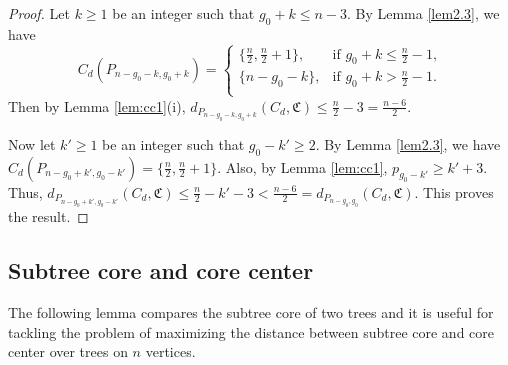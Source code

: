 \documentclass[11pt]{article}
\begin{document}
\begin{proof}
Let $k\geq 1$ be an integer such that $g_0+k\leq n-3$. By Lemma \ref{lem2.3}, we have 
$$C_d(P_{n-g_0-k,g_0+k})=\left\{
\begin{array}{ll}
 \{\frac{n}{2},\frac{n}{2}+1 \},  &\text{if $g_0+k\leq \frac{n}{2}-1$,}\\
  \{n-g_0-k\}, &\text{if $g_0+k> \frac{n}{2}-1$.}\\
\end{array}
\right.$$ 
Then by Lemma \ref{lem:cc1}(i), $d_{P_{n - g_0-k, g_0+k}}(C_d,\mathfrak{C})\leq \frac{n}{2} - 3=\frac{n-6}{2}.$

Now let $k'\geq 1$ be an integer such that $g_0-k'\geq 2$. By Lemma \ref{lem2.3}, we have $C_d(P_{n-g_0+k',g_0-k'})=\{\frac{n}{2},\frac{n}{2}+1 \}.$ Also, by Lemma \ref{lem:cc1}, $ p_{g_0-k'}\geq k'+3$. Thus, $d_{P_{n - g_0+k', g_0-k'}}(C_d,\mathfrak{C})\leq \frac{n}{2}-k'-3<\frac{n-6}{2}=d_{P_{n - g_0, g_0}}(C_d,\mathfrak{C})$. This proves the result.
\end{proof}


\subsection{Subtree core and core center}

The following lemma compares the subtree core of two trees and it is useful for tackling the problem of maximizing the distance between subtree core and core center over trees on $n$ vertices.
\end{document}
